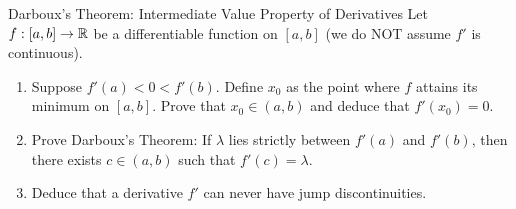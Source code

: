 \begin{exercise}{Darboux's Theorem: Intermediate Value Property of Derivatives}
Let $f: [a, b] \to \mathbb{R}$ be a differentiable function on $[a, b]$ (we do NOT assume $f'$ is continuous).
\begin{enumerate}[leftmargin=1.5em,itemsep=2pt]
  \item Suppose $f'(a) < 0 < f'(b)$. Define $x_0$ as the point where $f$ attains its minimum on $[a, b]$.
  Prove that $x_0 \in (a, b)$ and deduce that $f'(x_0) = 0$.
  \item Prove Darboux's Theorem: If $\lambda$ lies strictly between $f'(a)$ and $f'(b)$, then there exists $c \in (a, b)$ such that $f'(c) = \lambda$.
  \item Deduce that a derivative $f'$ can never have jump discontinuities.
\end{enumerate}
\end{exercise}

\begin{tabletworkspace}[5.5cm]
\end{tabletworkspace}

